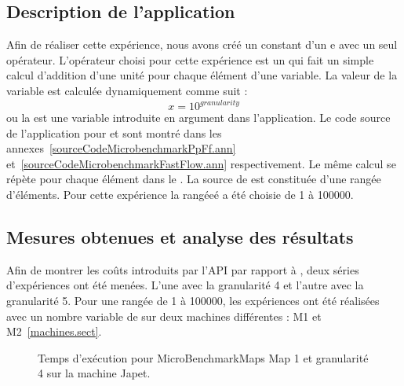 \subsection{Description de l'application}

Afin de r\'ealiser cette exp\'erience, nous avons cr\'e\'e un  constant d'un e avec un seul op\'erateur. L'op\'erateur choisi pour cette exp\'erience est un  qui fait un simple calcul d'addition d'une unit\'e pour chaque \'el\'ement d'une variable. La valeur de la variable est calcul\'ee dynamiquement comme suit : \[ x = 10^{granularity} \] ou la  est une variable introduite en argument dans l'application. Le code source de l'application pour  et  sont montr\'e dans les annexes~\ref{sourceCodeMicrobenchmarkPpFf.ann} et~\ref{sourceCodeMicrobenchmarkFastFlow.ann} respectivement. Le m\^eme calcul se r\'ep\`ete pour chaque \'el\'ement dans le . La source de  est constitu\'ee d'une rang\'ee d'\'el\'ements. Pour cette exp\'erience la rangée\'e a \'et\'e choisie de 1 \`a 100000.  


\subsection{Mesures obtenues et analyse des r\'esultats}

Afin de montrer les co\^uts introduits par l'API par rapport \`a , deux s\'eries d'exp\'eriences ont \'et\'e men\'ees. L'une avec la granularit\'e 4 et l'autre avec la granularit\'e 5. Pour une rang\'ee de 1 \`a 100000, les exp\'eriences ont \'et\'e r\'ealis\'ees avec un nombre variable de  sur deux machines diff\'erentes : M1 et M2~\ref{machines.sect}.  

\begin{figure}[H]
\centering
    \caption{Temps d'ex\'ecution pour MicroBenchmarkMaps Map 1 et granularit\'e 4 sur la machine Japet.}
    \label{JapetExecutionMicroBenchmarkGr4.fig}	
\end{figure}





